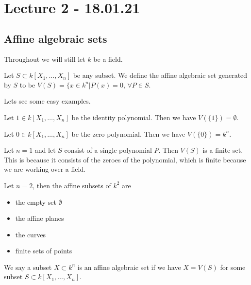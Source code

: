 \section{Lecture 2 - 18.01.21}

\subsection{Affine algebraic sets}

Throughout we will still let $k$ be a field. 

\begin{definition}
Let $S\subset k[X_1, \ldots, X_n]$ be any subset. We define the affine algebraic set generated by $S$ to be $V(S)=\{ x\in k^n \vert P(x)=0,\, \forall P\in S$. 
\end{definition}

Lets see some easy examples. 

\begin{example}

Let $1\in k[X_1, \ldots, X_n]$ be the identity polynomial. Then we have $V(\{1\}) = \emptyset$.
\end{example}

\begin{example}

Let $0\in k[X_1, \ldots, X_n]$ be the zero polynomial. Then we have $V(\{0\})=k^n$. 
\end{example}

\begin{example}

Let $n=1$ and let $S$ consist of a single polynomial $P$. Then $V(S)$ is a finite set. This is because it consists of the zeroes of the polynomial, which is finite because we are working over a field. 
\end{example}

\begin{example}

Let $n=2$, then the affine subsets of $k^2$ are
\begin{itemize}
    \item the empty set $\emptyset$
    \item the affine planes
    \item the curves
    \item finite sets of points
\end{itemize}
\end{example}

\begin{definition}
We say a subset $X\subset k^n$ is an affine algebraic set if we have $X=V(S)$ for some subset $S\subset k[X_1, \ldots, X_n]$.
\end{definition}

